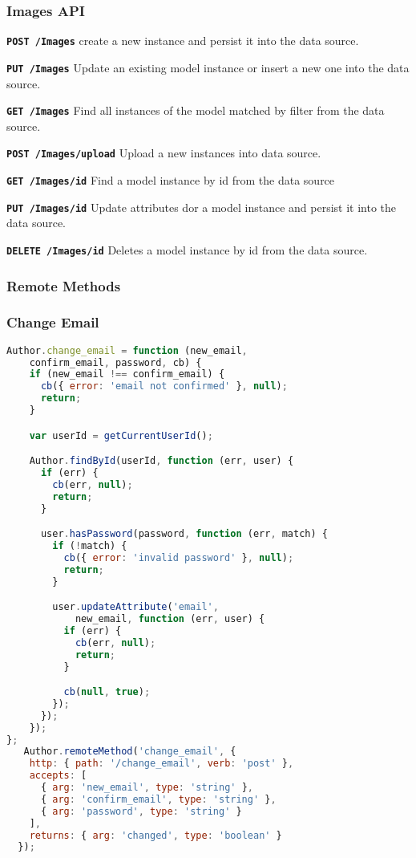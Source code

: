 \subsubsection{Images API}

\texttt{\textbf{POST /Images}} create a new instance and persist it into the data source.

\texttt{\textbf{PUT /Images}} Update an existing model instance or insert a new one into the data source.

\texttt{\textbf{GET /Images}} Find all instances of the model matched by filter from the data source.

\texttt{\textbf{POST /Images/upload}} Upload a new instances into data source.

\texttt{\textbf{GET /Images/{id}}} Find a model instance by id from the data source

\texttt{\textbf{PUT /Images/{id}}} Update attributes dor a model instance and persist it into the data source.

\texttt{\textbf{DELETE /Images/{id}}} Deletes a model instance by id from the data source.

\subsubsection{Remote Methods}

\subsubsection{Change Email}

\begin{lstlisting}[language=javascript]
Author.change_email = function (new_email, 
	confirm_email, password, cb) {
    if (new_email !== confirm_email) {
      cb({ error: 'email not confirmed' }, null);
      return;
    }

    var userId = getCurrentUserId();  

    Author.findById(userId, function (err, user) {
      if (err) {
        cb(err, null);
        return;
      }

      user.hasPassword(password, function (err, match) {
        if (!match) {
          cb({ error: 'invalid password' }, null);
          return;
        }

        user.updateAttribute('email', 
        	new_email, function (err, user) {
          if (err) {
            cb(err, null);
            return;
          }

          cb(null, true);
        });
	  });       
	});
};
   Author.remoteMethod('change_email', {
    http: { path: '/change_email', verb: 'post' },
    accepts: [
      { arg: 'new_email', type: 'string' },
      { arg: 'confirm_email', type: 'string' },
      { arg: 'password', type: 'string' }
    ],
    returns: { arg: 'changed', type: 'boolean' }
  });
\end{lstlisting}

